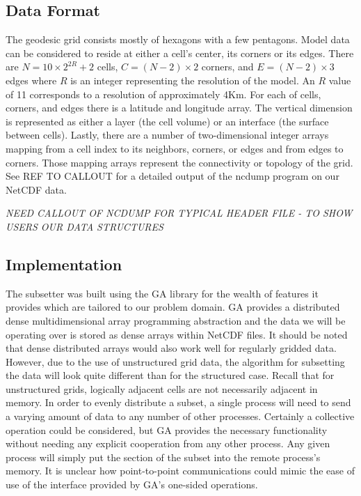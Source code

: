 \subsection{Data Format}

The geodesic grid consists mostly of hexagons with a few pentagons.  Model
data can be considered to reside at either a cell's center, its corners or its
edges.  There are $N = 10 \times 2^{2R} + 2$ cells, $C = (N-2) \times 2$
corners, and $E = (N-2) \times 3$ edges where $R$ is an integer representing
the resolution of the model.  An $R$ value of 11 corresponds to a resolution
of approximately 4Km.  For each of cells, corners, and edges there is a
latitude and longitude array.  The vertical dimension is represented as either
a layer (the cell volume) or an interface (the surface between cells).
Lastly, there are a number of two-dimensional integer arrays mapping from a
cell index to its neighbors, corners, or edges and from edges to corners.
Those mapping arrays represent the connectivity or topology of the grid.  See
REF TO CALLOUT for a detailed output of the ncdump program on our NetCDF data.

\emph{NEED CALLOUT OF NCDUMP FOR TYPICAL HEADER FILE - TO SHOW USERS OUR DATA
STRUCTURES}

\subsection{Implementation}

The subsetter was built using the GA library for the wealth of features it
provides which are tailored to our problem domain.  GA provides a distributed
dense multidimensional array programming abstraction and the data we will be
operating over is stored as dense arrays within NetCDF files.  It should be
noted that dense distributed arrays would also work well for regularly gridded
data.  However, due to the use of unstructured grid data, the algorithm for
subsetting the data will look quite different than for the structured case.
Recall that for unstructured grids, logically adjacent cells are not
necessarily adjacent in memory.  In order to evenly distribute a subset, a
single process will need to send a varying amount of data to any number of
other processes.  Certainly a collective operation could be considered, but GA
provides the necessary functionality without needing any explicit cooperation
from any other process.  Any given process will simply put the section of the
subset into the remote process's memory.  It is unclear how point-to-point
communications could mimic the ease of use of the interface provided by GA's
one-sided operations.

